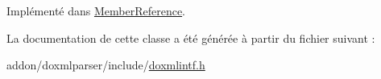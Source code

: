 Implémenté dans \hyperlink{class_member_reference_ae84cf19af62ffd5631f07c534cda2d77}{Member\+Reference}.



La documentation de cette classe a été générée à partir du fichier suivant \+:\begin{DoxyCompactItemize}
\item 
addon/doxmlparser/include/\hyperlink{include_2doxmlintf_8h}{doxmlintf.\+h}\end{DoxyCompactItemize}
